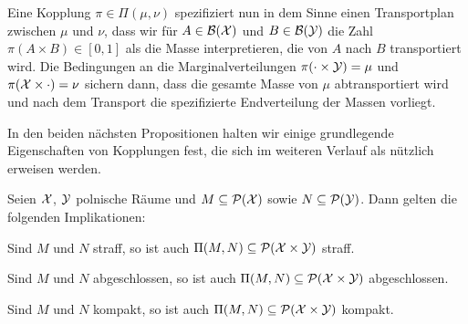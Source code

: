\documentclass[../thesis/thesis.tex]{subfiles}
\begin{document}
	Eine Kopplung $\pi \in \Pi(\mu, \nu)$ spezifiziert nun in dem Sinne einen Transportplan zwischen $\mu$ und $\nu$, dass wir für $A \in \mathcal{B}(\mathcal{X})$ und $B \in \mathcal{B}(\mathcal{Y})$ die Zahl
	$\pi(A \times B) \in [0, 1]$ als die Masse interpretieren, die von $A$ nach $B$ transportiert wird. Die Bedingungen an die Marginalverteilungen $\pi(\cdot \times \mathcal{Y}) = \mu$ und $\pi(\mathcal{X} \times \cdot) = \nu$ sichern dann, dass die gesamte Masse von $\mu$ abtransportiert wird und nach dem Transport die spezifizierte Endverteilung der Massen vorliegt.
	
	
	
	In den beiden nächsten Propositionen halten wir einige grundlegende Eigenschaften von Kopplungen fest, die sich im weiteren Verlauf als nützlich erweisen werden.

	\begin{Proposition}
		\label{proposition:eigenschaften_kopplungen}
		Seien $\mathcal{X}$, $\mathcal{Y}$ polnische Räume und $M \subseteq \mathcal{P}(\mathcal{X})$ sowie $N \subseteq \mathcal{P}(\mathcal{Y})$. Dann gelten die folgenden Implikationen:
		\begin{enumeratethm}
			\item Sind $M$ und $N$ straff, so ist auch $\Pi(M, N) \subseteq \mathcal{P}(\mathcal{X} \times \mathcal{Y})$ straff.
			\item Sind $M$ und $N$ abgeschlossen, so ist auch $\Pi(M, N) \subseteq \mathcal{P}(\mathcal{X} \times \mathcal{Y})$ abgeschlossen.
			\item Sind $M$ und $N$ kompakt, so ist auch $\Pi(M, N) \subseteq \mathcal{P}(\mathcal{X} \times \mathcal{Y})$ kompakt.
		\end{enumeratethm}
	\end{Proposition}
\end{document}
